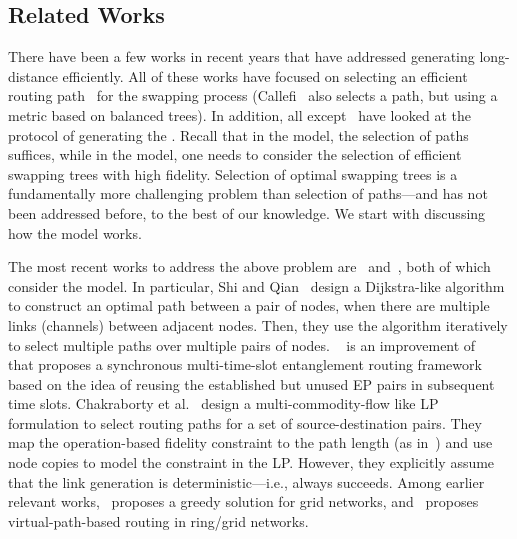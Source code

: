 \subsection{Related Works}
\label{sec:swapping_related}

There have been a few works in recent years that have addressed generating long-distance \epss
efficiently. All of these works have focused on selecting an efficient routing path~\cite{sigcomm20,yiming2023,yuhang2023} for the swapping
process (Callefi~\cite{caleffi} also selects a path, but using a metric based
on balanced trees).
In addition, all except~\cite{caleffi} have looked at the \os protocol of generating the
\epss. Recall that in the \os model, the selection of paths suffices, while in the \wt model, one needs
to consider the selection of efficient swapping trees with high fidelity.
Selection of optimal swapping trees is a fundamentally more challenging problem 
than selection of paths---and has not 
been addressed before, to the best of our knowledge.  We start with discussing how the \os model
works.

The most recent works to address the above problem are~\cite{sigcomm20} and~\cite{delft-lp}, 
both of which consider the \os model. 
In particular, Shi and Qian~\cite{sigcomm20} design a Dijkstra-like algorithm to construct an optimal path
between a pair of nodes, when there are multiple links (channels) between adjacent nodes. Then,
they use the algorithm iteratively to select multiple paths over multiple pairs of nodes.
~\cite{yuhang2023} is an improvement of~\cite{sigcomm20} that proposes a synchronous multi-time-slot entanglement routing framework
based on the idea of reusing the established but unused EP pairs in subsequent time slots.
Chakraborty et al.~\cite{delft-lp} design a multi-commodity-flow
like LP formulation to select routing paths for a set of source-destination pairs. They map
the operation-based fidelity constraint to the path length (as in~\cite{BreigelEtAl1998}) and use
node copies to model the constraint in the LP. However, they explicitly assume that the link
\eps generation is deterministic---i.e., always succeeds. 
Among earlier relevant works,~\cite{guha} proposes a greedy solution
for grid networks, and~\cite{greedy2019distributed} proposes 
virtual-path-based routing in ring/grid networks.

